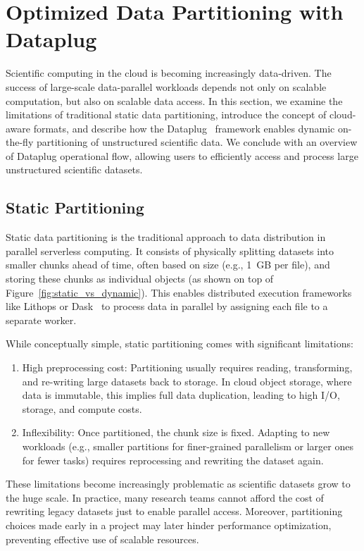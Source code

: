 \section{Optimized Data Partitioning with Dataplug}

Scientific computing in the cloud is becoming increasingly data-driven. The success of large-scale data-parallel workloads depends not only on scalable computation, but also on scalable data access. In this section, we examine the limitations of traditional static data partitioning, introduce the concept of cloud-aware formats, and describe how the Dataplug~\citep{dataplug} framework enables dynamic on-the-fly partitioning of unstructured scientific data. We conclude with an overview of Dataplug operational flow, allowing users to efficiently access and process large unstructured scientific datasets.

\subsection{Static Partitioning}

Static data partitioning is the traditional approach to data distribution in parallel serverless computing. It consists of physically splitting datasets into smaller chunks ahead of time, often based on size (e.g., 1~GB per file), and storing these chunks as individual objects (as shown on top of Figure~\ref{fig:static_vs_dynamic}). This enables distributed execution frameworks like Lithops or Dask~\citep{dask} to process data in parallel by assigning each file to a separate worker.

While conceptually simple, static partitioning comes with significant limitations:

\begin{enumerate}
    \item High preprocessing cost: Partitioning usually requires reading, transforming, and re-writing large datasets back to storage. In cloud object storage, where data is immutable, this implies full data duplication, leading to high I/O, storage, and compute costs.
    \item Inflexibility: Once partitioned, the chunk size is fixed. Adapting to new workloads (e.g., smaller partitions for finer-grained parallelism or larger ones for fewer tasks) requires reprocessing and rewriting the dataset again.
\end{enumerate}

These limitations become increasingly problematic as scientific datasets grow to the huge scale. In practice, many research teams cannot afford the cost of rewriting legacy datasets just to enable parallel access. Moreover, partitioning choices made early in a project may later hinder performance optimization, preventing effective use of scalable resources.

